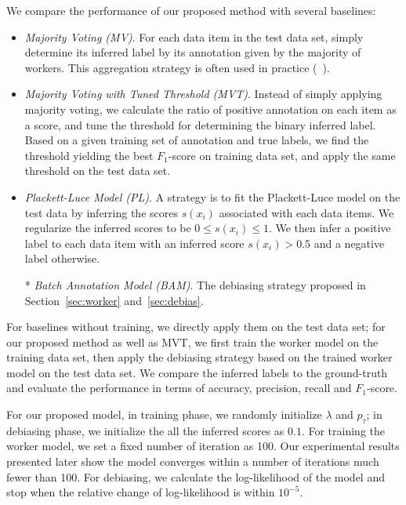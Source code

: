 We compare the performance of our proposed method with several baselines:
\begin{itemize}
  \item \emph{Majority Voting (MV)}.
        For each data item in the test data set, 
        simply determine its inferred label by its annotation given by the majority of workers.  
        This aggregation strategy is often used in practice (\eg~\cite{sheng:kdd2008}).  %
  \item \emph{Majority Voting with Tuned Threshold (MVT)}.
        Instead of simply applying majority voting, 
        we calculate the ratio of positive annotation on each item as a score, 
        and tune the threshold for determining the binary inferred label.  
        Based on a given training set of annotation and true labels, 
        we find the threshold yielding the best $F_1$-score on training data set, 
        and apply the same threshold on the test data set.  
  \item \emph{Plackett-Luce Model (PL)}.  
        A strategy is to fit the Plackett-Luce model on the test data by inferring the scores $s(x_i)$ associated with each data items.  
        We regularize the inferred scores to be $0 \leq s(x_i) \leq 1$.  
        We then infer a positive label to each data item with an inferred score $s(x_i) > 0.5$ and a negative label otherwise.  
  \item[*] \emph{Batch Annotation Model (BAM)}.  
        The debiasing strategy proposed in Section~\ref{sec:worker} and~\ref{sec:debias}.
\end{itemize}

For baselines without training, we directly apply them on the test data set; 
for our proposed method as well as MVT, we first train the worker model on the training data set, 
then apply the debiasing strategy based on the trained worker model on the test data set.  
We compare the inferred labels to the ground-truth and evaluate the performance in terms of accuracy, precision, recall and $F_1$-score.  

For our proposed model, 
in training phase, we randomly initialize $\lambda$ and $p_{\tau}$;
in debiasing phase, we initialize the all the inferred scores as $0.1$. 
For training the worker model, we set a fixed number of iteration as 100.  
Our experimental results presented later show the model converges within 
a number of iterations much fewer than 100.  
For debiasing, we calculate the log-likelihood of the model and stop when the relative change of log-likelihood is within $10^{-5}$.  


